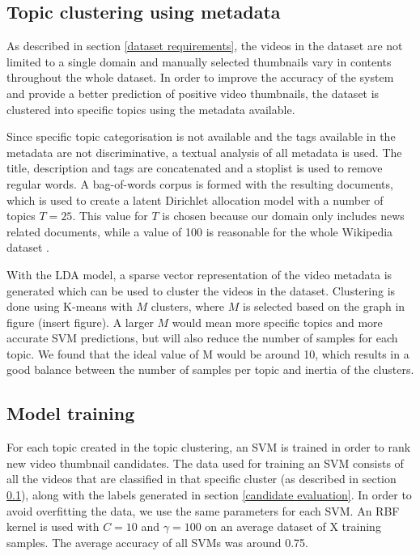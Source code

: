 \documentclass{../resources/sig-alternate-05-2015}
\begin{document}
\subsection{Topic clustering using metadata}
\label{topic clustering}

As described in section \ref{dataset requirements}, the videos in the dataset are not limited to a single domain and manually selected thumbnails vary in contents throughout the whole dataset. In order to improve the accuracy of the system and provide a better prediction of positive video thumbnails, the dataset is clustered into specific topics using the metadata available.

Since specific topic categorisation is not available and the tags available in the metadata are not discriminative, a textual analysis of all metadata is used. The title, description and tags are concatenated and a stoplist is used to remove regular words. A bag-of-words corpus is formed with the resulting documents, which is used to create a latent Dirichlet allocation model with a number of topics $T = 25$. This value for $T$ is chosen because our domain only includes news related documents, while a value of 100 is reasonable for the whole Wikipedia dataset \cite{Newman:2009uk,Blei:2003tn}.

With the LDA model, a sparse vector representation of the video metadata is generated which can be used to cluster the videos in the dataset. Clustering is done using K-means with $M$ clusters, where $M$ is selected based on the graph in figure (insert figure). A larger $M$ would mean more specific topics and more accurate SVM predictions, but will also reduce the number of samples for each topic. We found that the ideal value of M would be around 10, which results in a good balance between the number of samples per topic and inertia of the clusters.



\subsection{Model training}
\label{model training}

For each topic created in the topic clustering, an SVM is trained in order to rank new video thumbnail candidates. The data used for training an SVM consists of all the videos that are classified in that specific cluster (as described in section \ref{topic clustering}), along with the labels generated in section \ref{candidate evaluation}. In order to avoid overfitting the data, we use the same parameters for each SVM. An RBF kernel is used with $C = 10$ and $\gamma = 100$ on an average dataset of X training samples. The average accuracy of all SVMs was around 0.75.
\end{document}
